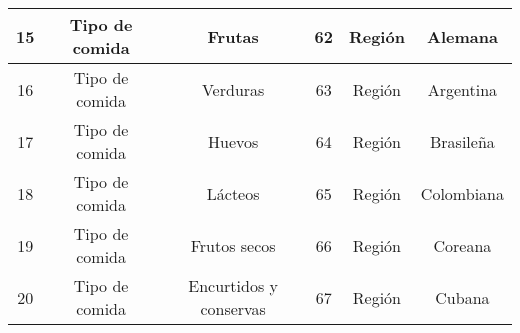 \begin{table}[h]
\begin{center}
\begin{tabular}{ | c | c | c | c | c | c |}
			\midrule
			15 & Tipo de comida & Frutas                 & 62 & Región  & Alemana       \\
			\midrule
			16 & Tipo de comida & Verduras               & 63 & Región  & Argentina     \\
			\midrule
			17 & Tipo de comida & Huevos                 & 64 & Región  & Brasileña    \\
			\midrule
			18 & Tipo de comida & Lácteos               & 65 & Región  & Colombiana    \\
			\midrule
			19 & Tipo de comida & Frutos secos           & 66 & Región  & Coreana       \\
			\midrule
			20 & Tipo de comida & Encurtidos y conservas & 67 & Región  & Cubana        \\
			\bottomrule
		\end{tabular}
	\end{center}
\end{table}
